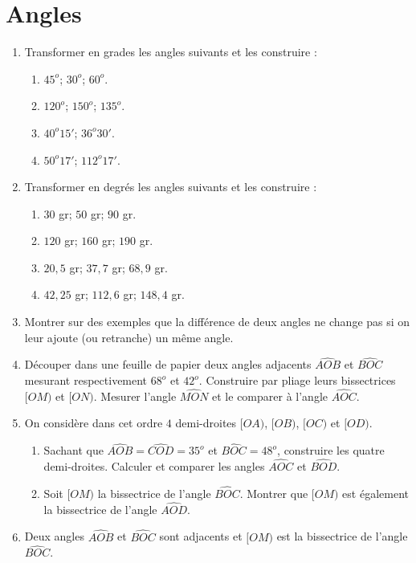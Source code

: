 \documentclass[12 pt]{report}
\theoremstyle{plain}
\newcounter{n}
\begin{document}
\chapter{Angles}  
\begin{enumerate}
\item Transformer en grades les angles suivants et les construire : 
\begin{enumerate}
\item $45^o$; $30^o$; $60^o$. 
\item $120^o$; $150^o$; $135^o$. 
\item $40^o15'$; $36^o30'$.
\item $50^o17'$; $112^o17'$. 
\end{enumerate}
\item Transformer en degrés les angles suivants et les construire : 
\begin{enumerate}
\item $30$ gr; $50$ gr; $90$ gr. 
\item $120$ gr; $160$ gr; $190$ gr. 
\item $20,5$ gr; $37,7$ gr; $68,9$ gr. 
\item $42,25$ gr; $112,6$ gr; $148,4$ gr. 
\end{enumerate} 
\item Montrer sur des exemples que la différence de deux angles ne change pas si on leur ajoute (ou retranche) un même angle.
\item Découper dans une feuille de papier deux angles adjacents $\widehat{AOB}$ et $\widehat{BOC}$ mesurant respectivement $68^o$ et $42^o$. Construire par pliage leurs bissectrices $[OM)$ et $[ON)$. Mesurer l'angle $\widehat{MON}$ et le comparer à l'angle $\widehat{AOC}$. 
\item On considère dans cet ordre $4$ demi-droites $[OA)$, $[OB)$, $[OC)$ et $[OD)$. 
\begin{enumerate}
\item Sachant que $\widehat{AOB}= \widehat{COD} = 35^o$ et $\widehat{BOC}=48^o$, construire les quatre demi-droites. Calculer et comparer les angles $\widehat{AOC}$ et $\widehat{BOD}$. 
\item Soit $[OM)$ la bissectrice de l'angle $\widehat{BOC}$. Montrer que $[OM)$ est également la bissectrice de l'angle $\widehat{AOD}$. 
\end{enumerate}
\item Deux angles $\widehat{AOB}$ et $\widehat{BOC}$ sont adjacents 
et $[OM)$ est la bissectrice de l'angle $\widehat{BOC}$. \begin{enumerate}

\end{enumerate}
\end{enumerate}
\end{document}
